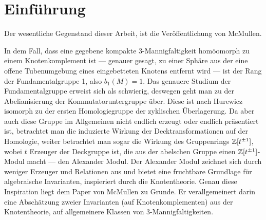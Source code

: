 \section{Einführung}
    Der wesentliche Gegenstand dieser Arbeit, ist die Veröffentlichung von McMullen. 

    In dem Fall, dass eine gegebene kompakte 3-Mannigfaltigkeit homöomorph zu einem Knotenkomplement ist --- genauer gesagt, zu einer Sphäre aus der eine offene Tubenumgebung eines eingebetteten Knotens entfernt wird --- ist der Rang der Fundamentalgruppe 1, also $b_1(M)=1$. Das genauere Studium der Fundamentalgruppe erweist sich als schwierig, deswegen geht man zu der Abelianisierung der Kommutatoruntergruppe über. Diese ist nach Hurewicz isomorph zu der ersten Homologiegruppe der zyklischen Überlagerung. Da aber auch diese Gruppe im Allgemeinen nicht endlich erzeugt oder endlich präsentiert ist, betrachtet man die induzierte Wirkung der Decktransformationen auf der Homologie, weiter betrachtet man sogar die Wirkung des Gruppenrings $\mathbb{Z} [t^{\pm 1}]$, wobei $t$ Erzeuger der Deckgruppe ist, die aus der abelschen Gruppe einen $\mathbb{Z} [t^{\pm 1}]$-Modul macht --- den Alexander Modul. 
    Der Alexander Modul zeichnet sich durch weniger Erzeuger und Relationen aus und bietet eine fruchtbare Grundlage für algebraische Invarianten, inspieriert durch die Knotentheorie. Genau diese Inspiration liegt dem Paper von McMullen zu Grunde. Er verallgemeinert darin eine Abschätzung zweier Invarianten (auf Knotenkomplementen) aus der Knotentheorie, auf allgemeinere Klassen von 3-Mannigfaltigkeiten.